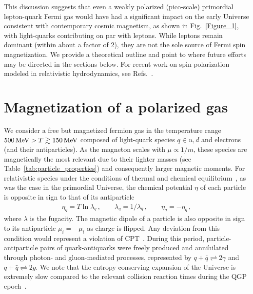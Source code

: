 \documentclass[epjST]{svjour}
\newcommand*{\MeV}{\text{\,MeV}}
\begin{document}
This discussion suggests that even a weakly polarized (pico-scale) primordial lepton-quark Fermi gas would have had a significant impact on the early Universe consistent with contemporary cosmic magnetism, as shown in Fig.~\ref{Figure_1}, with light-quarks contributing on par with leptons. While leptons remain dominant (within about a factor of 2), they are not the sole source of Fermi spin magnetization. We provide a theoretical outline and point to where future efforts may be directed in the sections below. For recent work on spin polarization modeled in relativistic hydrodynamics, see Refs.~\cite{Florkowski:2024cif,Bhadury:2024whs,Becattini:2024uha,Singh:2024cub}.

\section{Magnetization of a polarized gas}
\label{sec:magnetization}
We consider a free but magnetized fermion gas in the temperature range \(500\MeV>T\gtrsim150\MeV\) composed of light-quark species \(q \in {u,d}\) and electrons (and their antiparticles). As the magneton scales with \(\mu \propto 1/m\), these species are magnetically the most relevant due to their lighter masses (see Table~\ref{tab:particle_properties}) and consequently larger magnetic moments. For relativistic species under the conditions of thermal and chemical equilibrium~\cite{Elze:1980er}, as was the case in the primordial Universe, the chemical potential \(\eta\) of each particle is opposite in sign to that of its antiparticle
\begin{align}
\label{eq:equilibirum_conditions}
\eta_{q}=T\ln\lambda_{q}\,,\qquad
\lambda_{q}=1/\lambda_{\bar{q}}\,,\qquad
\eta_{q}=-\eta_{\bar{q}}\,,
\end{align}
where \(\lambda\) is the fugacity. The magnetic dipole of a particle is also opposite in sign to its antiparticle $\mu_{i}=-\mu_{\bar{i}}$ as charge is flipped. Any deviation from this condition would represent a violation of CPT~\cite{Colladay:1996iz,Bluhm:1997ci,BASE:2016yuo}. During this period, particle-antiparticle pairs of quark-antiquarks were freely produced and annihilated through photon- and gluon-mediated processes, represented by \(q+\bar{q}\rightleftharpoons2\gamma\) and \(q+\bar{q}\rightleftharpoons2g\). We note that the entropy conserving expansion of the Universe is extremely slow compared to the relevant collision reaction times during the QGP epoch~\cite{Yang:2024ret}.
\end{document}
